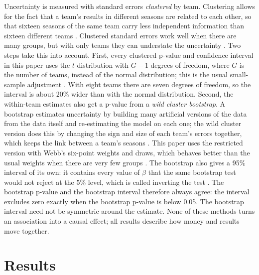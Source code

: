 \documentclass[11pt,a4paper]{article}
\begin{document}
Uncertainty is measured with standard errors \textit{clustered} by team. Clustering allows for the fact that a team's
results in different seasons are related to each other, so that sixteen seasons of the same team carry less independent
information than sixteen different teams \citep{cameron2015}. Clustered standard errors work well when there are many
groups, but with only \NTeams{} teams they can understate the uncertainty \citep{cameron2008}. Two steps take this into
account. First, every clustered p-value and confidence interval in this paper uses the $t$ distribution with $G-1$
degrees of freedom, where $G$ is the number of teams, instead of the normal distribution; this is the usual small-sample
adjustment \citep{cameron2015}. With eight teams there are seven degrees of freedom, so the interval is about 20\% wider
than with the normal distribution. Second, the within-team estimates also get a p-value from a \textit{wild cluster
bootstrap}. A bootstrap estimates uncertainty by building many
artificial versions of the data from the data itself and re-estimating the model on each one; the wild cluster version
does this by changing the sign and size of each team's errors together, which keeps the link between a team's seasons
\citep{cameron2008}. This paper uses the restricted version with Webb's six-point weights and \BootDraws{} draws, which
behaves better than the usual weights when there are very few groups \citep{webb2023}. The bootstrap also gives a 95\%
interval of its own: it contains every value of $\beta$ that the same bootstrap test would not reject at the 5\% level,
which is called inverting the test \citep{roodman2019}. The bootstrap p-value and the bootstrap interval therefore always
agree: the interval excludes zero exactly when the bootstrap p-value is below 0.05. The bootstrap interval need not be
symmetric around the estimate. None of these methods turns an association into a causal effect; all results describe how
money and results move together.

\section{Results}
\label{sec:results}
\end{document}
